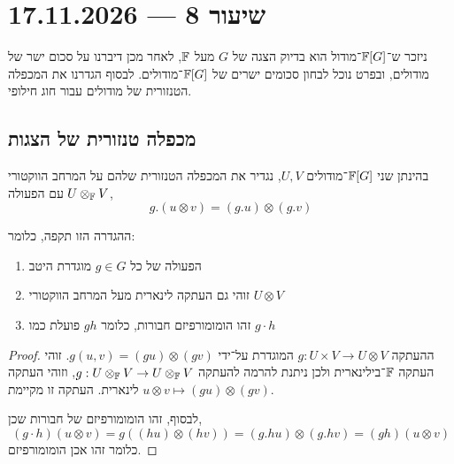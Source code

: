 \section{שיעור 8 --- 17.11.2026}
ניזכר ש־$\mathbb{F}[G]$־מודול הוא בדיוק הצגה של $G$ מעל $\mathbb{F}$, לאחר מכן דיברנו על סכום ישר של מודולים, ובפרט נוכל לבחון סכומים ישרים של $\mathbb{F}[G]$־מודולים.
לבסוף הגדרנו את המכפלה הטנזורית של מודולים עבור חוג חילופי.

\subsection{מכפלה טנזורית של הצגות}
\begin{definition}
	בהינתן שני $\mathbb{F}[G]$־מודולים $U, V$, נגדיר את המכפלה הטנזורית שלהם על המרחב הווקטורי $U \otimes_{\mathbb{F}} V$ עם הפעולה,
	\[
		g . (u \otimes v)
		= (g . u) \otimes (g . v)
	\]
\end{definition}
\begin{proposition}
	ההגדרה הזו תקפה, כלומר:
	\begin{enumerate}
		\item הפעולה של כל $g \in G$ מוגדרת היטב
		\item זוהי גם העתקה לינארית מעל המרחב הווקטורי $U \otimes V$
		\item זהו הומומורפיזם חבורות, כלומר $g h$ פועלת כמו $g \cdot h$
	\end{enumerate}
\end{proposition}
\begin{proof}
	ההעתקה $g : U \times V \to U \otimes V$ המוגדרת על־ידי $g(u, v) = (g u) \otimes (g v)$.
	זוהי העתקה $\mathbb{F}$־בילינארית ולכן ניתנת להרמה להעתקה $g : U \otimes_{\mathbb{F}} V \to U \otimes_{\mathbb{F}} V$, וזוהי העתקה לינארית.
	העתקה זו מקיימת $u \otimes v \mapsto (g u) \otimes (g v)$.

	לבסוף, זהו הומומורפיזם של חבורות שכן,
	\[
		(g \cdot h) (u \otimes v)
		= g((h u) \otimes (h v))
		= (g . h u) \otimes (g . h v)
		= (g h) (u \otimes v)
	\]
	כלומר זהו אכן הומומורפיזם.
\end{proof}
